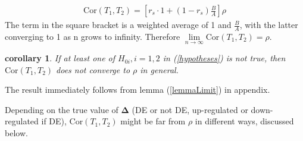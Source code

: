 \documentclass[12pt, a4paper]{article}
\newtheorem{corollary}{corollary}
\begin{document}
	\begin{align}\label{CalculateTCor}
		\text{Cor}(T_1, T_2) = \left[r_s \cdot 1 + (1-r_s)\frac{B}{A}\right]\rho
	\end{align}
	The term in the square bracket is a weighted average of 1 and $\frac{B}{A}$, with the latter
	converging to 1 as n grows to infinity. Therefore $\lim\limits_{n\rightarrow\infty} \text{Cor}({T_1,
		T_2}) = \rho$.
	\begin{corollary} 
		If at least one of $H_{0i}, i = 1, 2$ in (\ref{hypotheses}) is not true, then  $\text{Cor}({T_1,
			T_2})$ does not converge to $\rho$ in general.
	\end{corollary} 
	The result immediately follows from lemma  (\ref{lemmaLimit}) in appendix.
	
	Depending on the true value of $\bm\Delta$ (DE or not DE, up-regulated or down-regulated if DE),
	$\text{Cor}({T_1, T_2})$ might be far from $\rho$ in different ways, discussed below.
	
\end{document}
